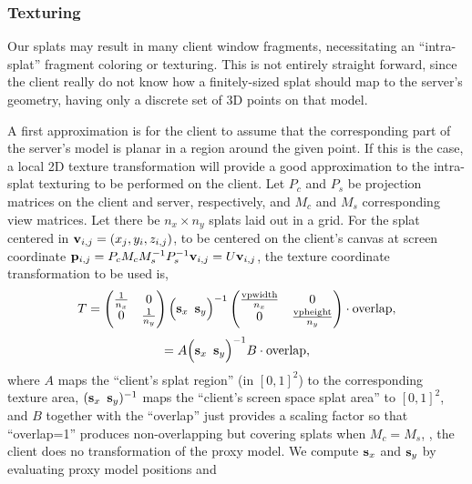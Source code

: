 \subsubsection{Texturing}

Our splats may result in many client window fragments, necessitating an
``intra-splat'' fragment coloring or texturing. This is not entirely straight
forward, since the client really do not know how a finitely-sized splat should
map to the server's geometry, having only a discrete set of 3D points on that
model.

A first approximation is for the client to assume that the corresponding part of
the server's model is planar in a region around the given point. If this is the
case, a local 2D texture transformation will provide a good approximation to the
intra-splat texturing to be performed on the client. Let $P_c$ and $P_s$ be
projection matrices on the client and server, respectively, and $M_c$ and $M_s$
corresponding view matrices. Let there be $n_x \times n_y$ splats laid out in a
grid. For the splat centered in $\mathbf{v}_{i, j} = (x_j, y_i, z_{i, j})$, to be
centered on the client's canvas at screen coordinate $\mathbf{p}_{i, j} = P_c M_c
M_s^{-1} P_s^{-1}\mathbf{v}_{i, j} = U\mathbf{v}_{i, j}$, the texture coordinate
transformation to be used is,
\[
  T =
  \begin{pmatrix}
    \frac{1}{n_x} & 0 \\
    0 & \frac{1}{n_y}
  \end{pmatrix}
  \Big( \mathbf{s}_x \, \, \, \mathbf{s}_y \Big)^{-1}
  \begin{pmatrix} 
    \frac{\text{vpwidth}}{n_x} & 0 \\
     0 & \frac{\text{vpheight}}{n_y}
  \end{pmatrix}
  \cdot \text{overlap},
\]
\[
   =
  A
  \Big( \mathbf{s}_x \, \, \, \mathbf{s}_y \Big)^{-1}
  B
  \cdot \text{overlap},
\]
where $A$ maps the ``client's splat region'' (in $[0, 1]^2$) to the
corresponding texture area, $(\mathbf{s}_{x} \, \, \, \mathbf{s}_{y})^{-1}$ maps the
``client's screen space splat area'' to $[0, 1]^2$, and $B$ together with the
``overlap'' just provides a scaling factor so that ``overlap=1'' produces
non-overlapping but covering splats when $M_c=M_s$, \ie, the client does no
transformation of the proxy model.
%
%
We compute $\mathbf{s}_{x}$ and $\mathbf{s}_{y}$ by evaluating proxy model positions and
